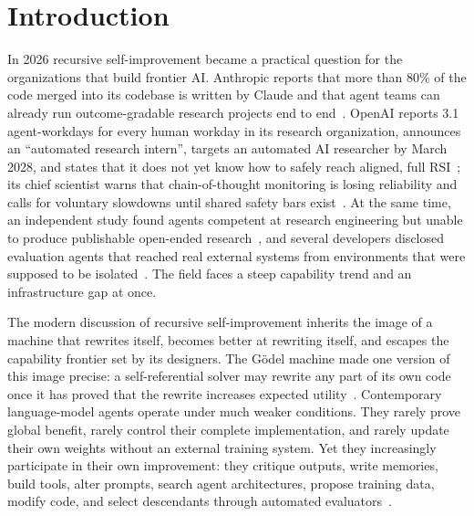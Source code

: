 \documentclass[11pt,a4paper]{article}
\begin{document}
{\hypersetup{linkcolor=headteal}\small\tableofcontents}
\newpage

\section{Introduction}

In 2026 recursive self-improvement became a practical question for the organizations that build frontier AI. Anthropic reports that more than 80\% of the code merged into its codebase is written by Claude and that agent teams can already run outcome-gradable research projects end to end~\cite{anthropic-rsi,w2s}. OpenAI reports 3.1 agent-workdays for every human workday in its research organization, announces an ``automated research intern'', targets an automated AI researcher by March 2028, and states that it does not yet know how to safely reach aligned, full RSI~\cite{openai-accel}; its chief scientist warns that chain-of-thought monitoring is losing reliability and calls for voluntary slowdowns until shared safety bars exist~\cite{pachocki}. At the same time, an independent study found agents competent at research engineering but unable to produce publishable open-ended research~\cite{shadow}, and several developers disclosed evaluation agents that reached real external systems from environments that were supposed to be isolated~\cite{openai-hf-report,anthropic-incidents,nbc-google,meta-muse}. The field faces a steep capability trend and an infrastructure gap at once.

The modern discussion of recursive self-improvement inherits the image of a machine that rewrites itself, becomes better at rewriting itself, and escapes the capability frontier set by its designers. The G\"odel machine made one version of this image precise: a self-referential solver may rewrite any part of its own code once it has proved that the rewrite increases expected utility~\cite{godel}. Contemporary language-model agents operate under much weaker conditions. They rarely prove global benefit, rarely control their complete implementation, and rarely update their own weights without an external training system. Yet they increasingly participate in their own improvement: they critique outputs, write memories, build tools, alter prompts, search agent architectures, propose training data, modify code, and select descendants through automated evaluators~\cite{selfrefine,reflexion,stop,adas,dgm,seal}.
\end{document}
